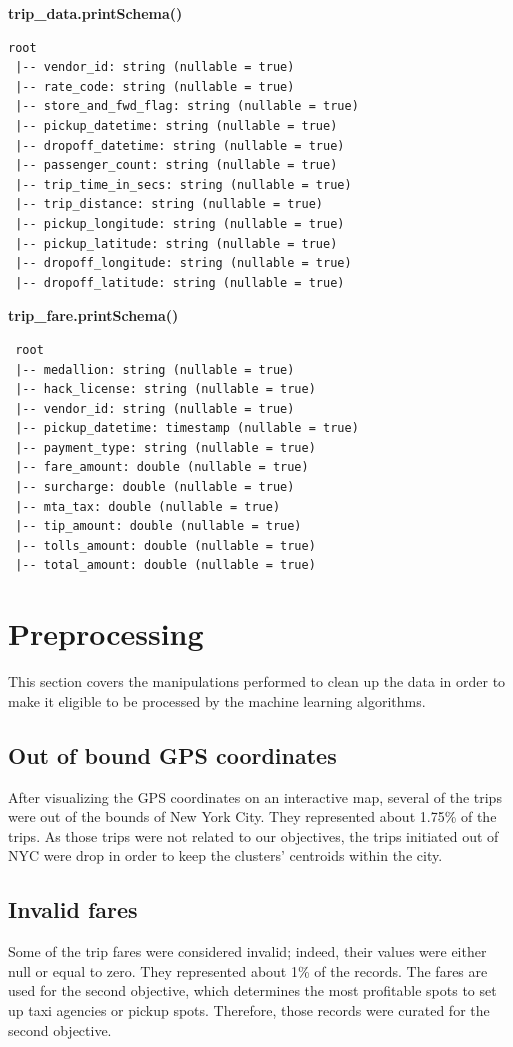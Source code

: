 \documentclass[a4paper]{article}
\begin{document}
\textbf{trip\_data.printSchema()}
\begin{verbatim}
root
 |-- vendor_id: string (nullable = true)
 |-- rate_code: string (nullable = true)
 |-- store_and_fwd_flag: string (nullable = true)
 |-- pickup_datetime: string (nullable = true)
 |-- dropoff_datetime: string (nullable = true)
 |-- passenger_count: string (nullable = true)
 |-- trip_time_in_secs: string (nullable = true)
 |-- trip_distance: string (nullable = true)
 |-- pickup_longitude: string (nullable = true)
 |-- pickup_latitude: string (nullable = true)
 |-- dropoff_longitude: string (nullable = true)
 |-- dropoff_latitude: string (nullable = true)
 \end{verbatim}
 

\textbf{trip\_fare.printSchema()}
\begin{verbatim}
 root
 |-- medallion: string (nullable = true)
 |-- hack_license: string (nullable = true)
 |-- vendor_id: string (nullable = true)
 |-- pickup_datetime: timestamp (nullable = true)
 |-- payment_type: string (nullable = true)
 |-- fare_amount: double (nullable = true)
 |-- surcharge: double (nullable = true)
 |-- mta_tax: double (nullable = true)
 |-- tip_amount: double (nullable = true)
 |-- tolls_amount: double (nullable = true)
 |-- total_amount: double (nullable = true)
 \end{verbatim}

\section{Preprocessing}
This section covers the manipulations performed to clean up the data in order to make it eligible to be processed by the machine learning algorithms.

\subsection{Out of bound GPS coordinates}
After visualizing the GPS coordinates on an interactive map, several of the trips were out of the bounds of New York City. They represented about 1.75\% of the trips. As those trips were not related to our objectives, the trips initiated out of NYC were drop in order to keep the clusters' centroids within the city.

\subsection{Invalid fares}
Some of the trip fares were considered invalid; indeed, their values were either null or equal to zero. They represented about 1\% of the records. The fares are used for the second objective, which determines the most profitable spots to set up taxi agencies or pickup spots. Therefore, those records were curated for the second objective.
\end{document}
